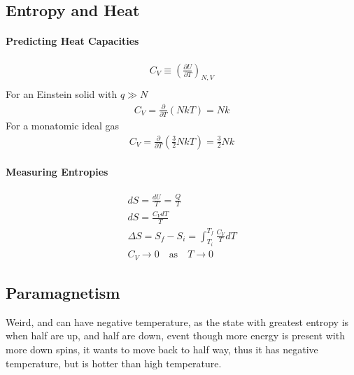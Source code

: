 \documentclass[10pt]{article}
\begin{document}
\subsection{Entropy and Heat}%
\label{sub:entropy_and_heat}

\paragraph{Predicting Heat Capacities}%
\label{par:predicting_heat_capacities}

\begin{align}
  C_V\equiv\left(\frac{\partial U}{\partial T}\right)_{N,V}\\
\end{align}
For an Einstein solid with $q \gg N$
\begin{align}
  C_V=\frac{\partial}{\partial T}\left(NkT\right)=Nk
\end{align}
For a monatomic ideal gas
\begin{align}
  C_V=\frac{\partial}{\partial T}\left(\frac{3}{2}NkT\right)=\frac{3}{2}Nk
\end{align}

\paragraph{Measuring Entropies}%
\label{par:measuring_entropies}

\begin{align}
  dS =\frac{dU}{T}=\frac{Q}{T}\\
  dS=\frac{C_VdT}{T}\\
  \Delta S=S_f-S_i=\int_{T_i}^{T_f}\frac{C_V}{T}dT\\
  C_V\rightarrow0\quad\text{as}\quad T\rightarrow0
\end{align}

\subsection{Paramagnetism}%
\label{sub:paramagnetism}

Weird, and can have negative temperature, as the state with greatest entropy is
when half are up, and half are down, event though more energy is present with
more down spins, it wants to move back to half way, thus it has negative
temperature, but is hotter than high temperature.
\end{document}

